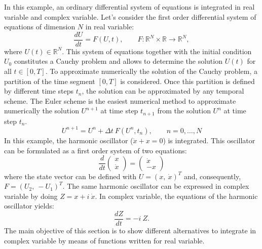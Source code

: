 In this example, an ordinary differential system of equations is integrated
in real variable and complex variable. 
Let's consider the first order 
differential system of equations of dimension $ N $ in real variable: 
\begin{equation}   
    \frac{dU }{ dt} =  F( U,t ) , \qquad 
    F: \mathbb{R}^N \times \mathbb{R} \rightarrow \mathbb{R}^N,   
    \label{cauchy}
\end{equation} 
where $ U(t) \in \mathbb{R}^N $. This system of equations together with 
the initial condition $ U_0 $ constitutes a Cauchy problem and allows 
to determine the solution $ U(t) $ for all $ t \in [0, T]$.
To approximate numerically the solution of the Cauchy problem, a partition of
the time segment $ [0, T] $ is considered. 
Once this partition is defined by different time steps $ t_n $, the solution 
can be approximated by any temporal scheme. 
The Euler scheme is the easiest numerical method to approximate numerically 
the solution $ U^{n+1} $ at time step $t_{n+1} $ from the solution 
$ U^{n} $ at time step $t_{n} $. 
\begin{equation}   
    U^{n+1}=  U^n + \Delta t \ F( U^n, t_n), \qquad 
    n=0, \ldots, N  
    \label{euler}   
\end{equation}
In this example, 
the harmonic oscillator ($ \ddot x   + x = 0 $)  is integrated.
This oscillator can be formulated as a first order system of two equations:
\begin{equation}   
    \frac{d}{dt }   
 \begin{pmatrix}
 x \\
 \dot x
 \end{pmatrix}   
    = 
  \begin{pmatrix}
  \dot x \\
  - x
  \end{pmatrix}
  \label{oscillator}
\end{equation}
where the state vector can be  defined with $ U = ( x, \ \dot x  )^T $ 
and, consequently,  $ F= ( U_2, \ -U_1  )^T $. The same harmonic oscillator
can be expressed in complex variable by doing  $ Z = x + i \ \dot x  $. 
In complex variable, the equations of the harmonic oscillator yields: 
\begin{equation}   
    \frac{dZ}{dt }  = - i \ Z.
    \label{coscillator}
\end{equation} 
The main objective of this section is to show different alternatives 
to integrate in complex variable by means of functions written for 
real variable. 

